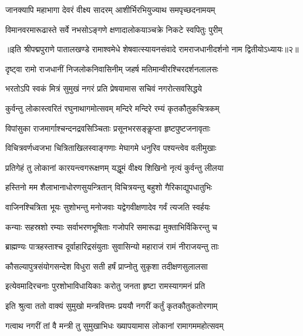 \twolineshloka
{जानक्यापि महाभागा देवरं वीक्ष्य सादरम्}
{आशीर्भिरभियुज्याथ समपृच्छदनामयम्}%

\twolineshloka
{विमानवरमारूढास्ते सर्वे नभसोऽङ्गणे}
{क्षणादालोकयाञ्चक्रे निकटे स्वपितुः पुरीम्}%

{॥इति श्रीपद्मपुराणे पातालखण्डे रामाश्वमेधे शेषवात्स्यायनसंवादे रामराजधानीदर्शनो नाम द्वितीयोऽध्यायः॥२॥}

\resetShloka


\twolineshloka
{दृष्ट्वा रामो राजधानीं निजलोकनिवासिनीम्}
{जहर्ष मतिमान्वीरश्चिरदर्शनलालसः}%

\twolineshloka
{भरतोऽपि स्वकं मित्रं सुमुखं नगरं प्रति}
{प्रेषयामास सचिवं नगरोत्सवसिद्धये}%


\twolineshloka
{कुर्वन्तु लोकास्त्वरितं रघुनाथागमोत्सवम्}
{मन्दिरे मन्दिरे रम्यं कृतकौतुकचित्रकम्}%

\twolineshloka
{विपांसुका राजमार्गाश्चन्दनद्रवसिञ्चिताः}
{प्रसूनभरसङ्कॢप्ता हृष्टपुष्टजनावृताः}%

\twolineshloka
{विचित्रवर्णध्वजभा चित्रिताखिलस्वाङ्गणाः}
{मेघागमे धनुरिव पश्यन्त्वेव वलीमुखाः}%

\twolineshloka
{प्रतिगेहं तु लोकानां कारयन्त्वगरूक्षणम्}
{यद्धूमं वीक्ष्य शिखिनो नृत्यं कुर्वन्तु लीलया}%

\twolineshloka
{हस्तिनो मम शैलाभानाधोरणसुयन्त्रितान्}
{विचित्रयन्तु बहुशो गैरिकाद्युपधातुभिः}%

\twolineshloka
{वाजिनश्चित्रिता भूयः सुशोभन्तु मनोजवाः}
{यद्वेगवीक्षणादेव गर्वं त्यजति स्वर्हयः}%

\twolineshloka
{कन्याः सहस्रशो रम्याः सर्वाभरणभूषिताः}
{गजोपरि समारूढा मुक्ताभिर्विकिरन्तु च}%

\twolineshloka
{ब्राह्मण्यः पात्रहस्ताश्च दूर्वाहारिद्रसंयुताः}
{सुवासिन्यो महाराजं रामं नीराजयन्तु ताः}%

\twolineshloka
{कौसल्यापुत्रसंयोगसन्देश विधुरा सती}
{हर्षं प्राप्नोतु सुकृशा तदीक्षणसुलालसा}%

\twolineshloka
{इत्येवमादिरचनाः पुरशोभाविधायिकाः}
{करोतु जनता हृष्टा रामस्यागमनं प्रति}%


\twolineshloka
{इति श्रुत्वा ततो वाक्यं सुमुखो मन्त्रवित्तमः}
{प्रययौ नगरीं कर्तुं कृतकौतुकतोरणाम्}%

\twolineshloka
{गत्वाथ नगरीं तां वै मन्त्री तु सुमुखाभिधः}
{ख्यापयामास लोकानां रामागममहोत्सवम्}%

